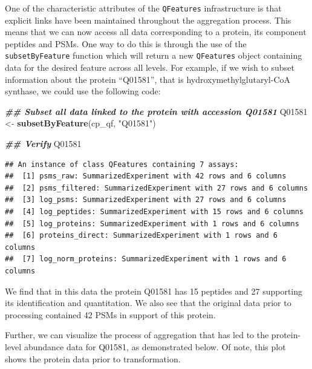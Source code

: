\documentclass[9pt,a4paper,]{extarticle}
\newenvironment{Shaded}{\begin{snugshade}}{\end{snugshade}}
\newcommand{\DocumentationTok}[1]{\textcolor[rgb]{0.56,0.35,0.01}{\textbf{\textit{#1}}}}
\newcommand{\FunctionTok}[1]{\textcolor[rgb]{0.13,0.29,0.53}{\textbf{#1}}}
\newcommand{\NormalTok}[1]{#1}
\newcommand{\OtherTok}[1]{\textcolor[rgb]{0.56,0.35,0.01}{#1}}
\newcommand{\StringTok}[1]{\textcolor[rgb]{0.31,0.60,0.02}{#1}}
\begin{document}
One of the characteristic attributes of the \texttt{QFeatures} infrastructure is that
explicit links have been maintained throughout the aggregation process. This
means that we can now access all data corresponding to a protein, its component
peptides and PSMs. One way to do this is through the use of the
\texttt{subsetByFeature} function which will return a new \texttt{QFeatures} object containing
data for the desired feature across all levels. For example, if we wish to
subset information about the protein ``Q01581'', that is hydroxymethylglutaryl-CoA
synthase, we could use the following code:

\begin{Shaded}
\begin{Highlighting}[]
\DocumentationTok{\#\# Subset all data linked to the protein with accession Q01581}
\NormalTok{Q01581 }\OtherTok{\textless{}{-}} \FunctionTok{subsetByFeature}\NormalTok{(cp\_qf, }\StringTok{"Q01581"}\NormalTok{)}

\DocumentationTok{\#\# Verify}
\NormalTok{Q01581}
\end{Highlighting}
\end{Shaded}

\begin{verbatim}
## An instance of class QFeatures containing 7 assays:
##  [1] psms_raw: SummarizedExperiment with 42 rows and 6 columns 
##  [2] psms_filtered: SummarizedExperiment with 27 rows and 6 columns 
##  [3] log_psms: SummarizedExperiment with 27 rows and 6 columns 
##  [4] log_peptides: SummarizedExperiment with 15 rows and 6 columns 
##  [5] log_proteins: SummarizedExperiment with 1 rows and 6 columns 
##  [6] proteins_direct: SummarizedExperiment with 1 rows and 6 columns 
##  [7] log_norm_proteins: SummarizedExperiment with 1 rows and 6 columns
\end{verbatim}

We find that in this data the protein Q01581 has 15
peptides and 27 supporting its identification
and quantitation. We also see that the original data prior to processing contained
42 PSMs in support of this protein.

Further, we can visualize the process of aggregation that has led to the protein-
level abundance data for Q01581, as demonstrated below. Of note, this plot shows
the protein data prior to transformation.
\end{document}
